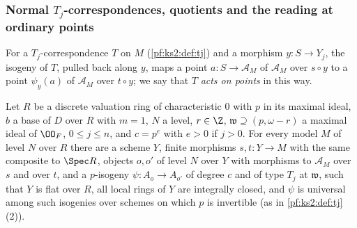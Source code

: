 \subsubsection{Normal $T_j$-correspondences, quotients and the reading at ordinary points}
\label{pf:ks2:sec:ordproofs}

For a $T_j$-correspondence $T$ on $M$ (\cref{pf:ks2:def:tj}) and a morphism $y\colon S\to Y_j$, the
isogeny of $T$, pulled back along $y$, maps a point $a\colon S\to\mathcal A_M$ of $\mathcal A_M$ over
$s\circ y$ to a point $\psi_y(a)$ of $\mathcal A_M$ over $t\circ y$; we say that $T$ \emph{acts on
points} in this way.

\begin{proposition}\label{pf:ks2:esnorm}
Let $R$ be a discrete valuation ring of characteristic $0$ with $p$ in its maximal ideal, $b$ a base
of $D$ over $R$ with $m=1$, $N$ a level, $r\in\Z$, $\mathfrak w\supseteq(p,\omega-r)$ a maximal ideal
of $\kstwoOF$, $0\le j\le n$, and $c=p^e$ with $e>0$ if $j>0$. For every model $M$ of level $N$ over
$R$ there are a scheme $Y$, finite morphisms $s,t\colon Y\to M$ with the same composite to $\Spec R$,
objects $o,o'$ of level $N$ over $Y$ with morphisms to $\mathcal A_M$ over $s$ and over $t$, and a
$p$-isogeny $\psi\colon A_o\to A_{o'}$ of degree $c$ and of type $T_j$ at $\mathfrak w$, such that
$Y$ is flat over $R$, all local rings of $Y$ are integrally closed, and $\psi$ is universal among
such isogenies over schemes on which $p$ is invertible (as in \cref{pf:ks2:def:tj}(2)).
\end{proposition}

